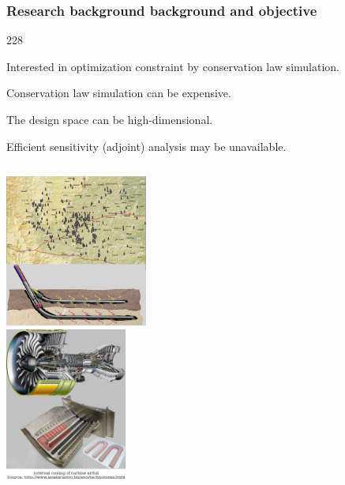 \documentclass{beamer}
\newcommand{\barrow}{\item[\color{darkred}\ding{228}]}
\begin{document}
\begin{frame}
    \frametitle{Research background \hfill \scriptsize{background and objective}}\small
    \begin{dinglist}{228}
        \barrow Interested in optimization constraint by conservation law simulation.
        \barrow Conservation law simulation can be expensive.
        \barrow The design space can be high-dimensional.
        \barrow Efficient sensitivity (adjoint) analysis may be unavailable.
    \end{dinglist}
    \begin{columns}
        \centering
            \includegraphics[height=5cm]{oil_forest_WTI.png}\\
        \centering
            \includegraphics[height=5cm]{turbine.png}
    \end{columns}
\end{frame}
\end{document}
